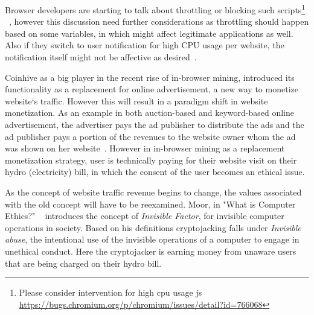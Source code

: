 Browser developers are starting to talk about throttling or blocking such scripts\footnote{Please consider intervention for high cpu usage js \url{https://bugs.chromium.org/p/chromium/issues/detail?id=766068}}  ~\cite{operanocoin}, however this discussion need further considerations as throttling should happen based on some variables, in which might affect legitimate applications as well. Also if they switch to user notification for high CPU usage per website, the notification itself might not be affective as desired~\cite{SHB11}\cite{SEAAC09}.

Coinhive as a big player in the recent rise of in-browser mining, introduced its functionality as a replacement for online advertisement, a new way to monetize website`s traffic. However this will result in a paradigm shift in website monetization. As an example in both auction-based and keyword-based online advertisement, the advertiser pays the ad publisher to distribute the ads and the ad publisher pays a portion of the revenues to the website owner whom the ad was shown on her website~\cite{king2007internet}. However in in-browser mining as a replacement monetization strategy, user is technically paying for their website visit on their hydro (electricity) bill, in which the consent of the user becomes an ethical issue. 

As the concept of website traffic revenue begins to change, the values associated with the old concept will have to be reexamined. Moor, in "What is Computer Ethics?" ~\cite{moor1985computer} introduces the concept of \textit{Invisible Factor}, for invisible computer operations in society. Based on his definitions cryptojacking falls under \textit{Invisible abuse}, the intentional use of the invisible operations of a computer to engage in unethical conduct. Here the cryptojacker is earning money from unaware users that are being charged on their hydro bill. 


